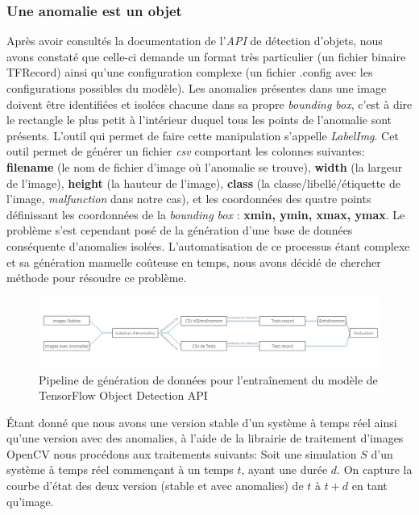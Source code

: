 \documentclass[french]{article}
\theoremstyle{mytheoremstyle}
\theoremstyle{mytheoremstyle}
\theoremstyle{myproblemstyle}
\begin{document}
        \subsubsection{Une anomalie est un objet}
        Après avoir consultés la documentation de l'\emph{API} de détection d'objets, nous avons constaté que celle-ci demande un format très particulier (un fichier binaire TFRecord) ainsi qu'une configuration complexe (un fichier .config avec les configurations possibles du modèle). Les anomalies présentes dans une image doivent être identifiées et isolées chacune dans sa propre \emph{bounding box}, c'est à dire le rectangle le plus petit à l'intérieur duquel tous les points de l'anomalie sont présents. L'outil qui permet de faire cette manipulation s'appelle \emph{LabelImg}. Cet outil permet de générer un fichier \emph{csv} comportant les colonnes suivantes: \textbf{filename} (le nom de fichier d'image où l'anomalie se trouve), \textbf{width} (la largeur de l'image), \textbf{height} (la hauteur de l'image), \textbf{class} (la classe/libellé/étiquette de l'image, \emph{malfunction} dans notre cas), et les coordonnées des quatre points définissant les coordonnées de la \emph{bounding box} : \textbf{xmin, ymin, xmax, ymax}. Le problème s'est cependant posé de la génération d'une  base de données conséquente d'anomalies isolées. L'automatisation de ce processus étant complexe et sa génération manuelle coûteuse en temps, nous avons décidé de chercher méthode pour résoudre ce problème.
        \begin{figure}[H]
            \centering
            \includegraphics[width=\textwidth]{images/od_datagen.jpg}
            \caption{Pipeline de génération de données pour l'entraînement du modèle de TensorFlow Object Detection API}
            \label{}
        \end{figure}
        \indent Étant donné que nous avons une version stable d'un système à temps réel ainsi qu'une version avec des anomalies, à l'aide de la librairie de traitement d'images OpenCV nous procédons aux traitements suivants:
        \newline
        Soit une simulation $S$ d'un système à temps réel commençant à un temps $t$, ayant une durée $d$. On capture la courbe d'état des deux version (stable et avec anomalies) de $t$ à $t+d$ en tant qu'image.
\end{document}
